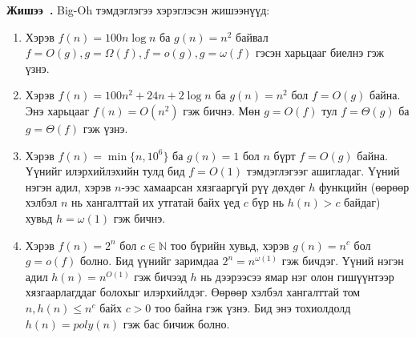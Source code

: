 \documentclass{article}
\newcounter{example}[section]
\newenvironment{example}[1][]{\refstepcounter{example}\par\medskip
   \noindent \textbf{Жишээ~\theexample. #1} \rmfamily}{\medskip}
\begin{document}
\begin{example}
    Big-Oh тэмдэглэгээ хэрэглэсэн жишээнүүд:
  \begin{enumerate}
    \item Хэрэв $f(n) = 100n \log n$ ба $g(n) = n^2$ байвал $f = O(g), g = \Omega(f), f = o(g), g = \omega(f)$ гэсэн харьцааг биелнэ гэж үзнэ.
    \item Хэрэв $f(n) = 100n^2 + 24n + 2 \log n$ ба $g(n) = n^2$ бол $f = O(g)$ байна. Энэ харьцааг $f(n) = O(n^2)$ гэж бичнэ. Мөн $g = O(f)$ тул $f=\Theta(g)$ ба $g=\Theta(f)$ гэж үзнэ.
    \item Хэрэв $f (n) = \min \{n, 10^6\}$ ба $g (n) = 1$ бол $n$ бүрт $f = O (g)$ байна. Үүнийг илэрхийлэхийн тулд бид $f = O (1)$ тэмдэглэгээг ашигладаг. Үүний нэгэн адил, хэрэв $n$-ээс хамаарсан хязгааргүй рүү дөхдөг $h$ функцийн (өөрөөр хэлбэл $n$ нь хангалттай их утгатай байх үед $c$ бүр нь $h(n)>c$ байдаг) хувьд $h = \omega(1)$ гэж бичнэ.
    \item Хэрэв $f (n) = 2^n$ бол $c\in\mathbb{N}$ тоо бүрийн хувьд, хэрэв $g(n) = n^c$ бол $g = o(f)$ болно. Бид үүнийг заримдаа $2^n = n^{\omega(1)}$ гэж бичдэг. Үүний нэгэн адил $h (n) = n^{O(1)}$ гэж бичээд $h$ нь дээрээсээ ямар нэг олон гишүүнтээр хязгаарлагддаг болохыг илэрхийлдэг. Өөрөөр хэлбэл хангалттай том $n, h(n)\leq{n^c}$ байх $c> 0$ тоо байна гэж үзнэ. Бид энэ тохиолдолд $h(n) = poly(n)$ гэж бас бичиж болно.
  \end{enumerate}
\end{example}
\end{document}
